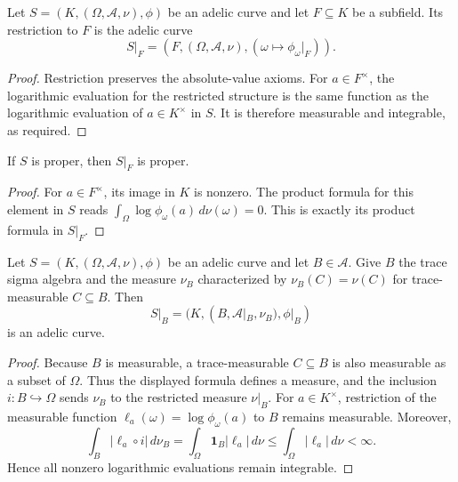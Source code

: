 \begin{definition}
\label{def:subfield-restriction}
\leanok
{}
Let $S=(K,(\Omega,\mathcal A,\nu),\phi)$ be an adelic curve and
let $F\subseteq K$ be a subfield. Its restriction to $F$ is the
adelic curve
\[
 S|_F=(F,(\Omega,\mathcal A,\nu),
            (\omega\mapsto\phi_\omega|_F)).
\]
\end{definition}
\begin{proof}
Restriction preserves the absolute-value axioms. For $a\in F^\times$,
the logarithmic evaluation for the restricted structure is the same
function as the logarithmic evaluation of $a\in K^\times$ in $S$.
It is therefore measurable and integrable, as required.
\end{proof}

\begin{proposition}
\label{prop:proper-subfield-restriction}
\leanok
{}
If $S$ is proper, then $S|_F$ is proper.
\end{proposition}
\begin{proof}
For $a\in F^\times$, its image in $K$ is nonzero. The product
formula for this element in $S$ reads
$\int_\Omega\log\phi_\omega(a)\,d\nu(\omega)=0$.
This is exactly its product formula in $S|_F$.
\end{proof}

\begin{definition}
\label{def:parameter-restriction}
\leanok
{}
Let $S=(K,(\Omega,\mathcal A,\nu),\phi)$ be an adelic curve and
let $B\in\mathcal A$. Give $B$ the trace sigma algebra and the
measure $\nu_B$ characterized by
$\nu_B(C)=\nu(C)$ for trace-measurable $C\subseteq B$.
Then
\[
 S|_B=(K,(B,\mathcal A|_B,\nu_B),\phi|_B)
\]
is an adelic curve.
\end{definition}
\begin{proof}
Because $B$ is measurable, a trace-measurable $C\subseteq B$ is
also measurable as a subset of $\Omega$. Thus the displayed formula
defines a measure, and the inclusion $i:B\hookrightarrow\Omega$
sends $\nu_B$ to the restricted measure $\nu|_B$.
For $a\in K^\times$, restriction of the measurable function
$\ell_a(\omega)=\log\phi_\omega(a)$ to $B$ remains measurable.
Moreover,
\[
 \int_B|\ell_a\circ i|\,d\nu_B
 =\int_\Omega\mathbf1_B|\ell_a|\,d\nu
 \leq\int_\Omega|\ell_a|\,d\nu<\infty.
\]
Hence all nonzero logarithmic evaluations remain integrable.
\end{proof}

